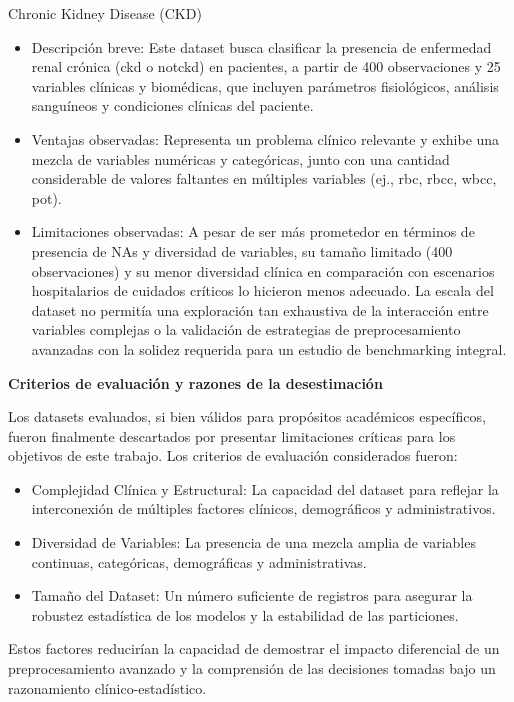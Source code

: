 Chronic Kidney Disease (CKD)~\citep{rubini2015}

\begin{itemize}
  \item Descripción breve: Este dataset busca clasificar la presencia de enfermedad
    renal crónica (ckd o notckd) en pacientes, a partir de 400 observaciones
    y 25 variables clínicas y biomédicas, que incluyen parámetros fisiológicos,
    análisis sanguíneos y condiciones clínicas del paciente.
  \item Ventajas observadas: Representa un problema clínico relevante y exhibe una
    mezcla de variables numéricas y categóricas, junto con una cantidad
    considerable de valores faltantes en múltiples variables (ej., rbc, rbcc,
    wbcc, pot).
  \item Limitaciones observadas: A pesar de ser más prometedor en términos de
    presencia de NAs y diversidad de variables, su tamaño limitado (400
    observaciones) y su menor diversidad clínica en comparación con escenarios
    hospitalarios de cuidados críticos lo hicieron menos adecuado. La escala del
    dataset no permitía una exploración tan exhaustiva de la interacción entre
    variables complejas o la validación de estrategias de preprocesamiento
    avanzadas con la solidez requerida para un estudio de benchmarking integral.
\end{itemize}

\textbf{Criterios de evaluación y razones de la desestimación}

Los datasets evaluados, si bien válidos para propósitos académicos específicos,
fueron finalmente descartados por presentar limitaciones críticas para los
objetivos de este trabajo. Los criterios de evaluación considerados fueron:

\begin{itemize}
  \item Complejidad Clínica y Estructural: La capacidad del dataset para reflejar la
    interconexión de múltiples factores clínicos, demográficos y
    administrativos.
  \item Diversidad de Variables: La presencia de una mezcla amplia de variables
    continuas, categóricas, demográficas y administrativas.
  \item Tamaño del Dataset: Un número suficiente de registros para asegurar la
    robustez estadística de los modelos y la estabilidad de las particiones.
\end{itemize}

Estos factores reducirían la capacidad de demostrar el
impacto diferencial de un preprocesamiento avanzado y la comprensión de las
decisiones tomadas bajo un razonamiento clínico-estadístico.

